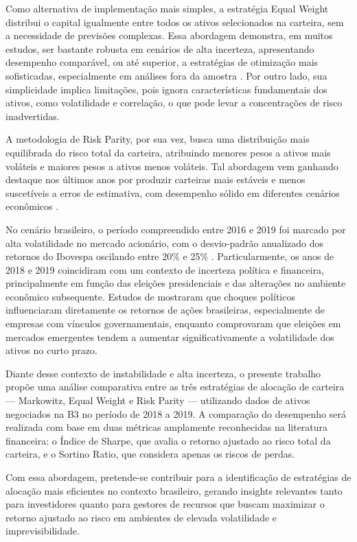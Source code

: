 Como alternativa de implementação mais simples, a estratégia Equal Weight distribui o capital igualmente entre todos os ativos selecionados na carteira, sem a necessidade de previsões complexas. Essa abordagem demonstra, em muitos estudos, ser bastante robusta em cenários de alta incerteza, apresentando desempenho comparável, ou até superior, a estratégias de otimização mais sofisticadas, especialmente em análises fora da amostra \cite{demiguel2009optimal}. Por outro lado, sua simplicidade implica limitações, pois ignora características fundamentais dos ativos, como volatilidade e correlação, o que pode levar a concentrações de risco inadvertidas.

A metodologia de Risk Parity, por sua vez, busca uma distribuição mais equilibrada do risco total da carteira, atribuindo menores pesos a ativos mais voláteis e maiores pesos a ativos menos voláteis. Tal abordagem vem ganhando destaque nos últimos anos por produzir carteiras mais estáveis e menos suscetíveis a erros de estimativa, com desempenho sólido em diferentes cenários econômicos \cite{maillard2010properties,palit2024study}.

No cenário brasileiro, o período compreendido entre 2016 e 2019 foi marcado por alta volatilidade no mercado acionário, com o desvio-padrão anualizado dos retornos do Ibovespa oscilando entre 20\% e 25\% \cite{gregorio2020volatilidade}. Particularmente, os anos de 2018 e 2019 coincidiram com um contexto de incerteza política e financeira, principalmente em função das eleições presidenciais e das alterações no ambiente econômico subsequente. Estudos de \cite{pereira2021impacto} mostraram que choques políticos influenciaram diretamente os retornos de ações brasileiras, especialmente de empresas com vínculos governamentais, enquanto \cite{carnahan2020electoral} comprovaram que eleições em mercados emergentes tendem a aumentar significativamente a volatilidade dos ativos no curto prazo.

Diante desse contexto de instabilidade e alta incerteza, o presente trabalho propõe uma análise comparativa entre as três estratégias de alocação de carteira --- Markowitz, Equal Weight e Risk Parity --- utilizando dados de ativos negociados na B3 no período de 2018 a 2019. A comparação do desempenho será realizada com base em duas métricas amplamente reconhecidas na literatura financeira: o Índice de Sharpe, que avalia o retorno ajustado ao risco total da carteira, e o Sortino Ratio, que considera apenas os riscos de perdas.

Com essa abordagem, pretende-se contribuir para a identificação de estratégias de alocação mais eficientes no contexto brasileiro, gerando insights relevantes tanto para investidores quanto para gestores de recursos que buscam maximizar o retorno ajustado ao risco em ambientes de elevada volatilidade e imprevisibilidade.

